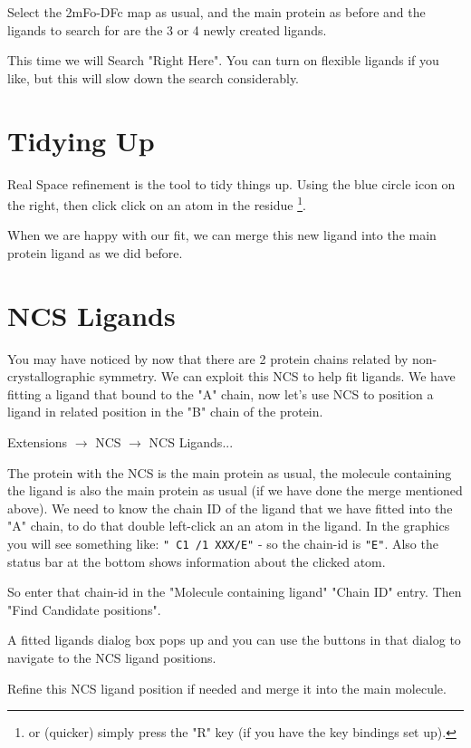 \documentclass{article}
\begin{document}
 Select the 2mFo-DFc map as usual, and the main protein as before and
 the ligands to search for are the 3 or 4 newly created ligands.

 This time we will Search "Right Here".  You can turn on flexible
 ligands if you like, but this will slow down the search
 considerably. 

\section{Tidying Up}

Real Space refinement is the tool to tidy things up. Using the blue
circle icon on the right, then click click on an atom in the residue
\footnote{or (quicker) simply press the "R" key (if you have the key
  bindings set up).}.

 When we are happy with our fit, we can merge this new ligand into the
 main protein ligand as we did before.

\section{NCS Ligands}

 You may have noticed by now that there are 2 protein chains related
 by non-crystallographic symmetry.  We can exploit this NCS to help
 fit ligands.  We have fitting a ligand that bound to the "A" chain,
 now let's use NCS to position a ligand in related position in the "B"
 chain of the protein.

 \textsf{Extensions $\rightarrow$ NCS $\rightarrow$ NCS Ligands...}

 The protein with the NCS is the main protein as usual, the molecule
 containing the ligand is also the main protein as usual (if we have
 done the merge mentioned above).  We need to know the chain ID of the
 ligand that we have fitted into the "A" chain, to do that double
 left-click an an atom in the ligand. In the graphics you will see
 something like: \texttt{" C1 /1 XXX/E"} - so the chain-id is
 \texttt{"E"}. Also the status bar at the bottom shows information about
 the clicked atom.

 So enter that chain-id in the "Molecule containing ligand" "Chain ID"
 entry.  Then \textsf{"Find Candidate positions"}.
 
 A fitted ligands dialog box pops up and you can use the buttons in
 that dialog to navigate to the NCS ligand positions.

 Refine this NCS ligand position if needed and merge it into the main
 molecule.
\end{document}
